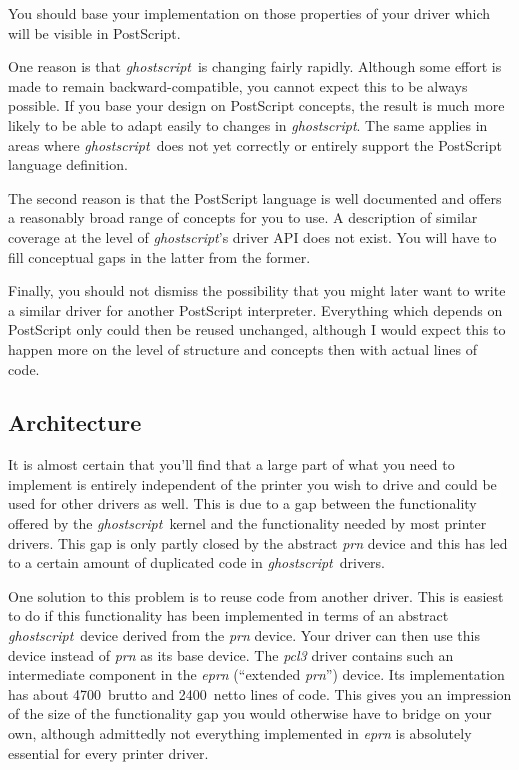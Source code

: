 \documentclass[twoside,a4paper]{article}
\newcommand{\gs}{\textit{ghostscript\/}}
\begin{document}
You should base your implementation on those properties of your driver which
will be visible in PostScript.

One reason is that \gs\ is changing fairly rapidly.
Although some effort is made to remain backward-compatible,
you cannot expect this to be always possible.
If you base your design on PostScript concepts,
the result is much more likely to be able to adapt easily to changes in \gs.
The same applies in areas where \gs\ does not yet correctly or entirely support
the PostScript language definition.

The second reason is that the PostScript language is well documented and offers
a reasonably broad range of concepts for you to use.
A description of similar coverage at the level of \gs's driver API does not
exist.
You will have to fill conceptual gaps in the latter from the former.

Finally, you should not dismiss the possibility that you might later want to
write a similar driver for another PostScript interpreter.
Everything which depends on PostScript only could then be reused unchanged,
although I would expect this to happen more on the level of structure and
concepts then with actual lines of code.


\subsection{Architecture}

It is almost certain that you'll find that a large part of what you need to
implement is entirely independent of the printer you wish to drive
and could be used for other drivers as well.
This is due to a gap between the functionality offered by the \gs\ kernel and
the functionality needed by most printer drivers.
This gap is only partly closed by the abstract \textit{prn\/} device
and this has led to a certain amount of duplicated code in \gs\ drivers.

One solution to this problem is to reuse code from another driver.
This is easiest to do if this functionality has been implemented in terms of an
abstract \gs\ device derived from the \textit{prn\/} device.
Your driver can then use this device instead of \textit{prn\/} as its base
device.
The \textit{pcl3\/} driver contains such an intermediate component in the
\textit{eprn\/} (``extended \textit{prn\/}'') device.
Its implementation has about
4700~brutto and 2400~netto lines of code.	%
This gives you an impression of the size of the functionality gap you would
otherwise have to bridge on your own,
although admittedly not everything implemented in \textit{eprn\/} is
absolutely essential for every printer driver.
\end{document}
